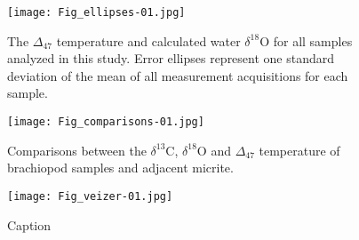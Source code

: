 \documentclass{article}
\newcommand{\deltao}{$\delta^{18}$}
\newcommand{\deltac}{$\delta^{13}$}
\begin{document}
\begin{figure}[htb]
\centering
\texttt{[image: Fig\_ellipses-01.jpg]}
\caption{The $\Delta_{47}$ temperature and calculated water \deltao O for all samples analyzed in this study. Error ellipses represent one standard deviation of the mean of all measurement acquisitions for each sample.}
\label{ellipses}
\end{figure}

\begin{figure}[htb]
\centering
\texttt{[image: Fig\_comparisons-01.jpg]}
\caption{Comparisons between the \deltac C, \deltao O and $\Delta_{47}$ temperature of brachiopod samples and adjacent micrite.}
\label{comparisons}
\end{figure}

\begin{figure}[htb]
\centering
\texttt{[image: Fig\_veizer-01.jpg]}
\caption{Caption}
\label{veizer}
\end{figure}
\end{document}
